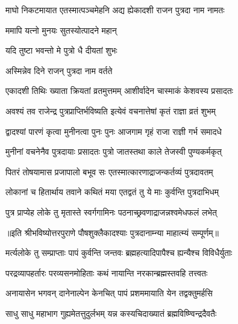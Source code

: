 \twolineshloka
{माघो निकटमायात एतस्मात्पञ्चमेहनि}
{अद्य ह्येकादशी राजन पुत्रदा नाम नामतः} %



\onelineshloka
{ममापि यत्नो मुनयः सुतस्योत्पादने महान्} %

\onelineshloka
{यदि तुष्टा भवन्तो मे पुत्रो धै दीयतां शुभः}


\onelineshloka
{अस्मिन्नेव दिने राजन् पुत्रदा नाम वर्तते} %

\twolineshloka
{एकादशी तिथिः ख्याता क्रियतां व्रतमुत्तमम्}
{आशीर्वादेन चास्माकं केशवस्य प्रसादतः} %

\twolineshloka
{अवश्यं तव राजेन्द्र पुत्रप्राप्तिर्भविष्यति}
{इत्येवं वचनात्तेषां कृतं राज्ञा व्रतं शुभम्} %


\twolineshloka
{द्वादश्यां पारणं कृत्वा मुनीनत्वा पुनः पुनः}
{आजगाम गृहं राजा राज्ञी गर्भ समादधे} %

\twolineshloka
{मुनीनां वचनेनैव पुत्रदायाः प्रसादतः}
{पुत्रो जातस्तथा काले तेजस्वी पुण्यकर्मकृत्} %

\twolineshloka
{पितरं तोषयामास प्रजापालो बभूव सः}
{एतस्मात्कारणाद्राजन्कर्तव्यं पुत्रदावतम्} %

\twolineshloka
{लोकानां च हितार्थाय तवाने कथितं मया}
{एतद्वतं तु ये माः कुर्वन्ति पुत्रदाभिधम्} %

\twolineshloka
{पुत्र प्राप्येह लोके तु मृतास्ते स्वर्गगामिनः}
{पठनाच्छ्रवणाद्राजन्नश्वमेधफलं लभेत्} %

॥इति श्रीभविष्योत्तरपुराणे पौषशुक्लैकादश्याः पुत्रदानाम्न्या माहात्म्यं सम्पूर्णम्॥



\twolineshloka
{मर्त्यलोके तु सम्प्राप्ताः पापं कुर्वन्ति जन्तवः}
{ब्रह्महत्यादिपापैश्च ह्यन्यैश्च विविधैर्युताः} %

\twolineshloka
{परद्रव्यापहर्तारः परव्यसनमोहिताः}
{कथं नायान्ति नरकान्ब्रह्मस्तवहि तत्त्वतः} %

\twolineshloka
{अनायासेन भगवन् दानेनाल्पेन केनचित्}
{पापं प्रशममायाति येन तद्वक्तुमर्हसि} %


\twolineshloka
{साधु साधु महाभाग गुह्यमेतत्तुदुर्लभम्}
{यन्न कस्यचिदाख्यातं ब्रह्मविष्ण्विन्द्रदैवतैः} %

